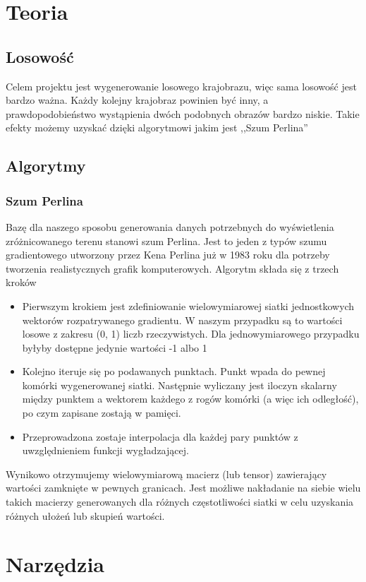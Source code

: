 \documentclass[12pt,a4paper]{article}
\begin{document}
\section{Teoria}
\subsection{Losowość}
Celem projektu jest wygenerowanie losowego krajobrazu, więc sama losowość jest bardzo ważna. Każdy kolejny krajobraz powinien być inny, a prawdopodobieństwo wystąpienia dwóch podobnych obrazów bardzo niskie. Takie efekty możemy uzyskać dzięki algorytmowi jakim jest ,,Szum Perlina''
\subsection{Algorytmy}
\subsubsection{Szum Perlina}
Bazę dla naszego sposobu generowania danych potrzebnych do wyświetlenia zróżnicowanego terenu stanowi szum Perlina. Jest to jeden z typów szumu gradientowego utworzony przez Kena Perlina już w 1983 roku dla potrzeby tworzenia realistycznych grafik komputerowych. 
Algorytm składa się z trzech kroków
\begin{itemize}
\item Pierwszym krokiem jest zdefiniowanie wielowymiarowej siatki jednostkowych wektorów rozpatrywanego gradientu. W naszym przypadku są to wartości losowe z zakresu (0, 1) liczb rzeczywistych. Dla jednowymiarowego przypadku byłyby dostępne jedynie wartości -1 albo 1
\item Kolejno iteruje się po podawanych punktach. Punkt wpada do pewnej komórki wygenerowanej siatki. Następnie wyliczany jest iloczyn skalarny między punktem a wektorem każdego z rogów komórki (a więc ich odległość), po czym zapisane zostają w pamięci.
\item Przeprowadzona zostaje interpolacja dla każdej pary punktów z uwzględnieniem funkcji wygładzającej.
\end{itemize}
Wynikowo otrzymujemy wielowymiarową macierz (lub tensor) zawierający wartości zamknięte w pewnych granicach. Jest możliwe nakładanie na siebie wielu takich macierzy generowanych dla różnych częstotliwości siatki w celu uzyskania różnych ułożeń lub skupień wartości.
\newpage
\section{Narzędzia}
\end{document}
